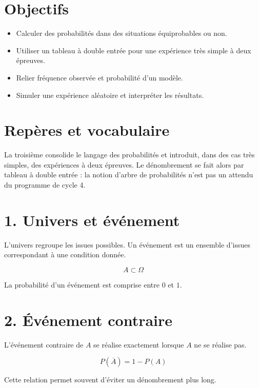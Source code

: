 
\section{Objectifs}
\begin{itemize}
\item Calculer des probabilités dans des situations équiprobables ou non.
\item Utiliser un tableau à double entrée pour une expérience très simple à deux épreuves.
\item Relier fréquence observée et probabilité d’un modèle.
\item Simuler une expérience aléatoire et interpréter les résultats.
\end{itemize}

\section{Repères et vocabulaire}
La troisième consolide le langage des probabilités et introduit, dans des cas très simples, des expériences à deux épreuves. Le dénombrement se fait alors par tableau à double entrée : la notion d’arbre de probabilités n’est pas un attendu du programme de cycle 4.

\section{1. Univers et événement}
L’univers regroupe les issues possibles. Un événement est un ensemble d’issues correspondant à une condition donnée.

\[
A\subset\Omega
\]

\begin{exemple}
La probabilité d’un événement est comprise entre $0$ et $1$.
\end{exemple}

\section{2. Événement contraire}
L’événement contraire de $A$ se réalise exactement lorsque $A$ ne se réalise pas.

\[
P(\overline A)=1-P(A)
\]

\begin{exemple}
Cette relation permet souvent d’éviter un dénombrement plus long.
\end{exemple}

